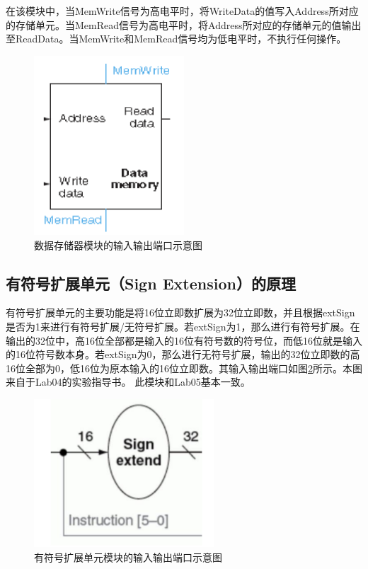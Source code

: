 在该模块中，当MemWrite信号为高电平时，将WriteData的值写入Address所对应的存储单元。当MemRead信号为高电平时，将Address所对应的存储单元的值输出至ReadData。当MemWrite和MemRead信号均为低电平时，不执行任何操作。
\begin{figure}[!h]
    \centering
    \includegraphics[width=0.5\textwidth]{./datamemory.png}
    \caption{数据存储器模块的输入输出端口示意图}
    \label{datamemory}
\end{figure}


\subsection{有符号扩展单元（Sign Extension）的原理}

有符号扩展单元的主要功能是将16位立即数扩展为32位立即数，并且根据extSign是否为1来进行有符号扩展/无符号扩展。若extSign为1，那么进行有符号扩展。在输出的32位中，高16位全部都是输入的16位有符号数的符号位，而低16位就是输入的16位符号数本身。若extSign为0，那么进行无符号扩展，输出的32位立即数的高16位全部为0，低16位为原本输入的16位立即数。其输入输出端口如图\ref{signextention}所示。本图来自于Lab04的实验指导书。
此模块和Lab05基本一致。
\begin{figure}[!h]
    \centering
    \includegraphics[width=0.6\textwidth]{./signext.png}
    \caption{有符号扩展单元模块的输入输出端口示意图}
    \label{signextention}
\end{figure}

